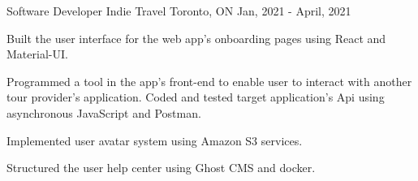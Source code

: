 \begin{cventries}
  \cventry
	{Software Developer} %
	{Indie Travel} %
	{Toronto, ON} %
	{Jan, 2021 - April, 2021} %
	{
		\begin{cvitems} %
			\item {Built the user interface for the web app’s onboarding pages using React and Material-UI.}
			\item {Programmed a tool in the app's front-end to enable user to interact with another tour provider's application. Coded and tested target application's Api using asynchronous JavaScript and Postman.}
			\item {Implemented user avatar system using Amazon S3 services.}
			\item {Structured the user help center using Ghost CMS and docker.}
		\end{cvitems}
	}

\end{cventries}
